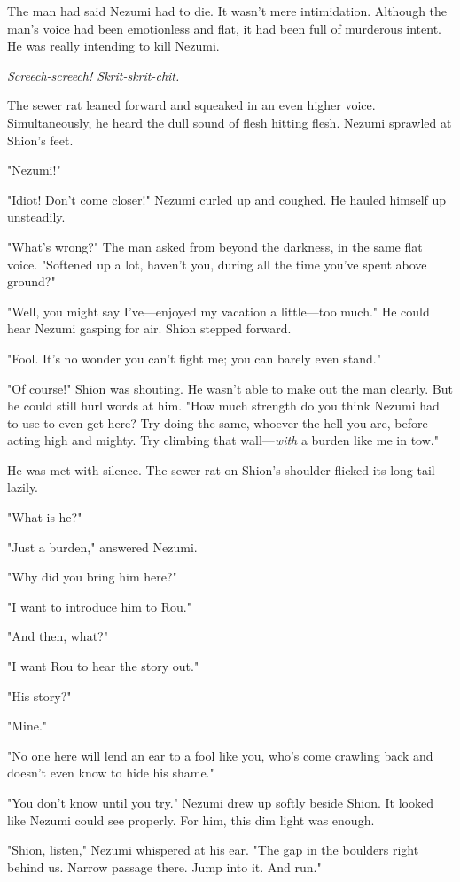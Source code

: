 The man had said Nezumi had to die. It wasn't mere intimidation.
Although the man's voice had been emotionless and flat, it had been full
of murderous intent. He was really intending to kill Nezumi.

\emph{Screech-screech! Skrit-skrit-chit.}

The sewer rat leaned forward and squeaked in an even higher voice.
Simultaneously, he heard the dull sound of flesh hitting flesh. Nezumi
sprawled at Shion's feet.

"Nezumi!"

"Idiot! Don't come closer!" Nezumi curled up and coughed. He hauled
himself up unsteadily.

"What's wrong?" The man asked from beyond the darkness, in the same flat
voice. "Softened up a lot, haven't you, during all the time you've spent
above ground?"

"Well, you might say I've---enjoyed my vacation a little---too much." He
could hear Nezumi gasping for air. Shion stepped forward.

"Fool. It's no wonder you can't fight me; you can barely even stand."

"Of course!" Shion was shouting. He wasn't able to make out the man
clearly. But he could still hurl words at him. "How much strength do you
think Nezumi had to use to even get here? Try doing the same, whoever
the hell you are, before acting high and mighty. Try climbing that
wall---\emph{with} a burden like me in tow."

He was met with silence. The sewer rat on Shion's shoulder flicked its
long tail lazily.

"What is he?"

"Just a burden," answered Nezumi.

"Why did you bring him here?"

"I want to introduce him to Rou."

"And then, what?"

"I want Rou to hear the story out."

"His story?"

"Mine."

"No one here will lend an ear to a fool like you, who's come crawling
back and doesn't even know to hide his shame."

"You don't know until you try." Nezumi drew up softly beside Shion. It
looked like Nezumi could see properly. For him, this dim light was
enough.

"Shion, listen," Nezumi whispered at his ear. "The gap in the boulders
right behind us. Narrow passage there. Jump into it. And run."

